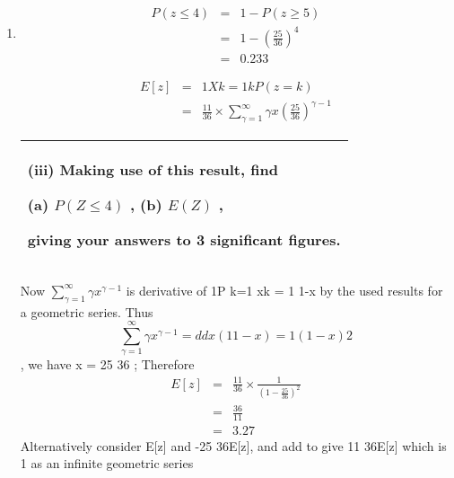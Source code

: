 \documentclass[a4paper,12pt]{article}
\begin{document}
\begin{enumerate}
    
     

    
    
\item 
\begin{eqnarray*}
P(z \leq 4) &=& 1 - P(z \geq 5) \\
&=& 1 - \left( \frac{25}{36} \right)^4 \\
&=&  0.233
\end{eqnarray*}


\begin{eqnarray*}
E[z] &=&
1X
k=1
kP(z = k) \\ &=& \frac{11}{36} \times \sum^{\infty}_{\gamma=1} \gamma x 
\left(\frac{25}{36}
\right)^{\gamma-1}
\end{eqnarray*}
  \begin{table}[ht!]
     \centering
     \begin{tabular}{|p{15cm}|}
     \hline  
(iii) Making use of this result, find 
 
(a) $P(Z \leq 4)$ , (b) $E(Z)$ , 
 
giving your answers to 3 significant figures. 
 \\ \hline 
      \end{tabular}
    \end{table}
Now
$\sum^{\infty}_{\gamma=1} \gamma x ^{\gamma-1}$ is derivative of
1P
k=1
xk = 1
1-x by the used results for a geometric series.
Thus
\[\sum^{\infty}_{\gamma=1} \gamma x ^{\gamma-1} = d
dx ( 1
1-x ) = 1
(1-x)2 \], we have x = 25
36 ;
Therefore
\begin{eqnarray*}
E[z] &=& \frac{11}{36} \times \frac{1}{(1- \frac{25}{36})^2} \\ &=& \frac{36}{11} 
\\ &=& 3.27
\end{eqnarray*}
Alternatively consider E[z] and -25
36E[z], and add to give 11
36E[z] which is 1 as an
infinite geometric series
\end{enumerate}
\end{document}
